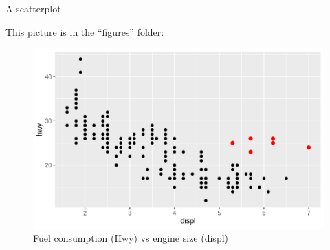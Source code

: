 \begin{frame}{A scatterplot}

This picture is in the ``figures'' folder:

\begin{figure}
\includegraphics[scale=.5]{figures/outl.png}
\caption{Fuel consumption (Hwy) vs engine size (displ)}
\end{figure}

\end{frame}


